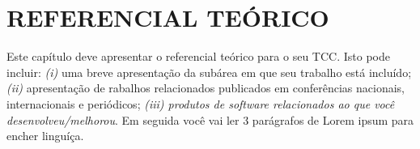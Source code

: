 \newpage
\chapter{REFERENCIAL TEÓRICO}\label{cap:referencial}

Este capítulo deve apresentar o referencial teórico para o seu TCC. Isto pode incluir:  \textit{(i)} uma breve apresentação da subárea em que seu trabalho está incluído;  \textit{(ii)} apresentação de rabalhos relacionados publicados em conferências nacionais, internacionais e periódicos;  \textit{(iii) produtos de software relacionados ao que você desenvolveu/melhorou}. Em seguida você vai ler 3 parágrafos de Lorem ipsum para encher linguíça.

\lipsum[3-5]



